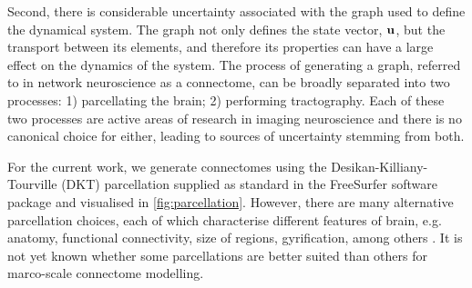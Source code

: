 Second, there is considerable uncertainty associated with the graph used to
define the dynamical system. The graph not only defines the state vector,
$\mathbf{u}$, but the transport between its elements, and therefore its properties
can have a large effect on the dynamics of the system. The process of
generating a graph, referred to in network neuroscience as a connectome, can be
broadly separated into two processes: 1) parcellating the brain; 2) performing
tractography. Each of these two processes are active areas of research in
imaging neuroscience and there is no canonical choice for either, leading to
sources of uncertainty stemming from both. 

For the current work, we generate connectomes using the
Desikan-Killiany-Tourville (DKT) parcellation supplied as standard in the FreeSurfer
software package \cite{fischl2004automatically, klein2012101} and visualised in
\cref{fig:parcellation}. However, there are many alternative parcellation
choices, each of which characterise different features of brain, e.g. anatomy,
functional connectivity, size of regions, gyrification, among others
\cite{lawrence2021standardizing, moghimi2021review}. It is not yet known whether
some parcellations are better suited than others for marco-scale connectome
modelling.  

